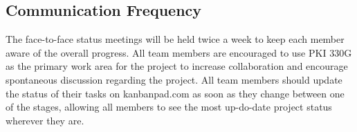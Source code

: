 \subsection{Communication Frequency}
The face-to-face status meetings will be held twice a week to keep each member aware of the overall progress.
All team members are encouraged to use PKI 330G as the primary work area for the project to increase collaboration and encourage spontaneous discussion regarding the project.
All team members should update the status of their tasks on kanbanpad.com as soon as they change between one of the stages, allowing all members to see the most up-do-date project status wherever they are.

